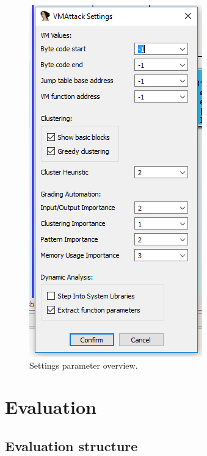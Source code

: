 \documentclass[10pt,twoside,a4paper,bibliography=totoc]{scrbook}
\begin{document}
\begin{figure}[htp]
\centering
\includegraphics[scale=0.60]{images/ch3/settings.png}
\caption{Settings parameter overview.}
\label{settings}
\end{figure}

%
% 


\chapter{Evaluation}
\label{sec4:evaluation}
\section{Evaluation structure}
\end{document}
